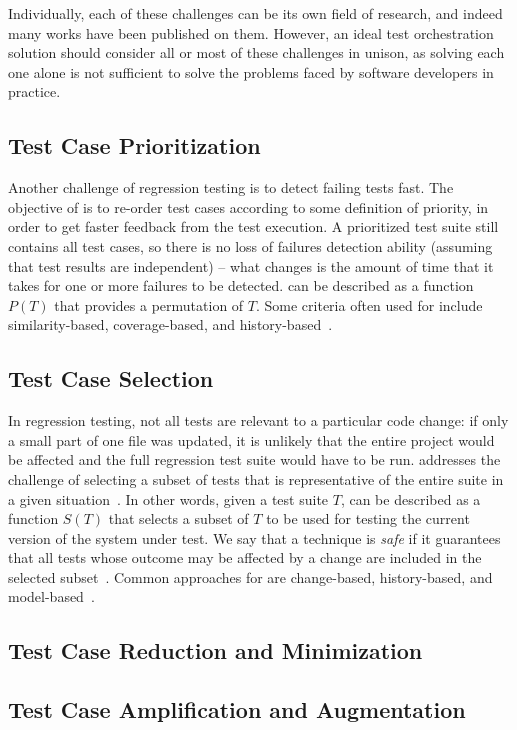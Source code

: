 Individually, each of these challenges can be its own field of research, and indeed many works have been published on them.
However, an ideal test orchestration solution should consider all or most of these challenges in unison, as solving each one alone is not sufficient to solve the problems faced by software developers in practice.

\subsection{Test Case Prioritization}\label{sec:tcp}

Another challenge of regression testing is to detect failing tests fast.
The objective of \tcp is to re-order test cases according to some definition of priority, in order to get faster feedback from the test execution.
A prioritized test suite still contains all test cases, 
so there is no loss of failures detection ability (assuming that test results are independent) -- what changes is the amount of time that it takes for one or more failures to be detected.
\tcp can be described as a function $P(T)$ that provides a permutation of $T$.
Some criteria often used for \tcp include similarity-based, coverage-based, and history-based~\cite{khatibsyarbini_test_2018}.


\subsection{Test Case Selection}\label{sec:tcs}

In regression testing, not all tests are relevant to a particular code change:
if only a small part of one file was updated, it is unlikely that the entire project would be affected and the full regression test suite would have to be run.
\tcs addresses the challenge of selecting a subset of tests that is representative of the entire suite in a given situation~\cite{YooHarman10RegressionTestingSurvey, RothermelHarrold94FrameworkForEvaluationRTS}.
In other words, given a test suite $T$, 
\tcs can be described as a function $S(T)$ that selects a subset of $T$ to be used for testing the current version of the system under test.
We say that a \tcs technique is \emph{safe} if it guarantees that all tests whose outcome may be affected by a change are included in the selected subset~\cite{RothermelHarrold94FrameworkForEvaluationRTS}. 
Common approaches for \tcs are change-based, history-based, and model-based~\cite{kazmi_effective_2017}.

\subsection{Test Case Reduction and Minimization}\label{sec:tsr}

\subsection{Test Case Amplification and Augmentation}\label{sec:tsa}
